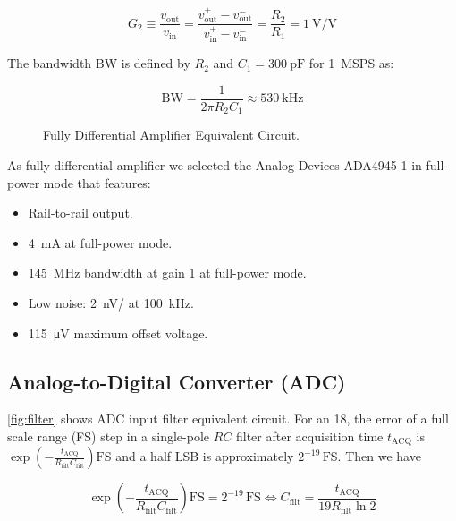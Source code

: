 \begin{equation}
    G_2 \equiv \frac{v_\text{out}}{v_\text{in}} =\frac{{v_\text{out}^+-v_\text{out}^-}}{v_\text{in}^+-v_\text{in}^-}= \frac{R_2}{R_1} = \SI{1}{\volt/\volt}
\end{equation}

The bandwidth BW is defined by $R_2$ and $C_1=\SI{300}{\pico\farad}$ for \SI{1}{\mega SPS} as:

\begin{equation}
    \text{BW} = \frac{1}{2\pi R_2 C_1} \approx \SI{530}{\kilo\hertz}
\end{equation}

\begin{figure}[ht]
  \centering
  
  \caption{Fully Differential Amplifier Equivalent Circuit.}
  \label{fig:fda}
\end{figure}

As fully differential amplifier we selected the Analog Devices ADA4945-1 in full-power mode that features:

\begin{itemize}
    \item Rail-to-rail output.
    \item \SI{4}{\milli\ampere} at full-power mode.
    \item \SI{145}{\mega\hertz} bandwidth at gain 1 at full-power mode.
    \item Low noise: \SI{2}{\nano\volt/\sqrtunit{\hertz}} at \SI{100}{\kilo\hertz}.
    \item \SI{115}{\micro\volt} maximum offset voltage.
\end{itemize}

\subsection{Analog-to-Digital Converter (ADC)}

\autoref{fig:filter} shows ADC input filter equivalent circuit. For an \SI{18}{\bit}, the error of a full scale range (FS) step in a single-pole $RC$ filter after acquisition time $t_\text{ACQ}$ is $\exp\left(-\frac{t_\text{ACQ}}{R_\text{filt}C_\text{filt}}\right)\text{FS}$ and a half LSB is approximately $2^{-19}\, \text{FS}$. Then we have

\begin{equation}
    \exp\left(-\frac{t_\text{ACQ}}{R_\text{filt}C_\text{filt}}\right)\text{FS} = 2^{-19}\,\text{FS} \Leftrightarrow C_\text{filt} = \frac{t_\text{ACQ}}{19R_\text{filt}\ln 2}
\end{equation}

